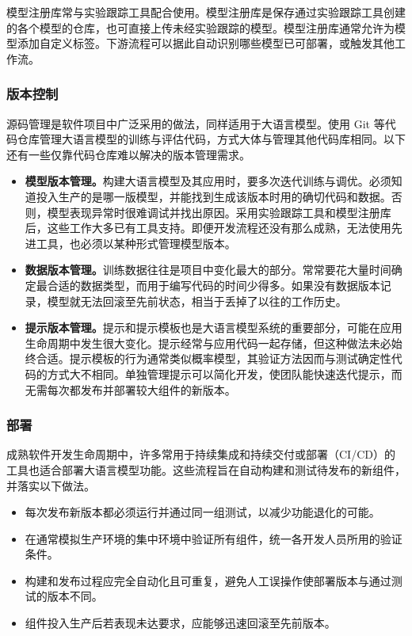 模型注册库常与实验跟踪工具配合使用。模型注册库是保存通过实验跟踪工具创建的各个模型的仓库，也可直接上传未经实验跟踪的模型。模型注册库通常允许为模型添加自定义标签。下游流程可以据此自动识别哪些模型已可部署，或触发其他工作流。

\subsubsection{版本控制}
源码管理是软件项目中广泛采用的做法，同样适用于大语言模型。使用 Git 等代码仓库管理大语言模型的训练与评估代码，方式大体与管理其他代码库相同。以下还有一些仅靠代码仓库难以解决的版本管理需求。

\begin{itemize}
\item \textbf{模型版本管理。}构建大语言模型及其应用时，要多次迭代训练与调优。必须知道投入生产的是哪一版模型，并能找到生成该版本时用的确切代码和数据。否则，模型表现异常时很难调试并找出原因。采用实验跟踪工具和模型注册库后，这些工作大多已有工具支持。即便开发流程还没有那么成熟，无法使用先进工具，也必须以某种形式管理模型版本。
\item \textbf{数据版本管理。}训练数据往往是项目中变化最大的部分。常常要花大量时间确定最合适的数据类型，而用于编写代码的时间少得多。如果没有数据版本记录，模型就无法回滚至先前状态，相当于丢掉了以往的工作历史。
\item \textbf{提示版本管理。}提示和提示模板也是大语言模型系统的重要部分，可能在应用生命周期中发生很大变化。提示经常与应用代码一起存储，但这种做法未必始终合适。提示模板的行为通常类似概率模型，其验证方法因而与测试确定性代码的方式大不相同。单独管理提示可以简化开发，使团队能快速迭代提示，而无需每次都发布并部署较大组件的新版本。
\end{itemize}

\subsubsection{部署}
成熟软件开发生命周期中，许多常用于持续集成和持续交付或部署（CI/CD）的工具也适合部署大语言模型功能。这些流程旨在自动构建和测试待发布的新组件，并落实以下做法。

\begin{itemize}
\item 每次发布新版本都必须运行并通过同一组测试，以减少功能退化的可能。
\item 在通常模拟生产环境的集中环境中验证所有组件，统一各开发人员所用的验证条件。
\item 构建和发布过程应完全自动化且可重复，避免人工误操作使部署版本与通过测试的版本不同。
\item 组件投入生产后若表现未达要求，应能够迅速回滚至先前版本。
\end{itemize}

